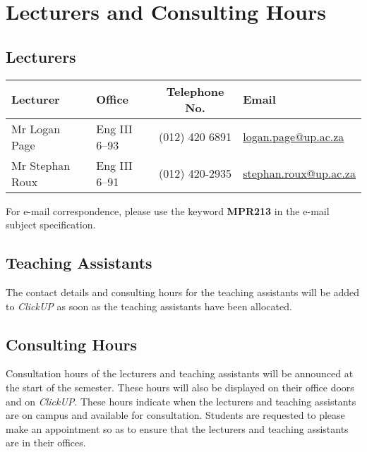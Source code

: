 \section{Lecturers and Consulting Hours}
    \subsection{Lecturers}
        \begin{table}[!h]
            \begin{center}
             \begin{tabular}{|l|l|c|l|}
                 \hline
                 {\bf Lecturer} & {\bf Office} & {\bf Telephone No.} & {\bf Email} \\
                 \hline
                 Mr Logan Page &
                 Eng III 6--93 &
                 (012) 420 6891 &
                 \href{mailto:logan.page@up.ac.za}{logan.page@up.ac.za} \\
                 Mr Stephan Roux &
                 Eng III 6--91 &
                 (012) 420-2935 &
                 \href{mailto:stephan.roux@up.ac.za}{stephan.roux@up.ac.za} \\
                 \hline
             \end{tabular}
            \end{center}
        \end{table}

        For e-mail correspondence, please use the keyword
        \textbf{MPR213} in the e-mail subject specification.

    \subsection{Teaching Assistants}
        The contact details and consulting hours for the teaching assistants
        will be added to {\it ClickUP} as soon as the teaching assistants have
        been allocated.

    \subsection{Consulting Hours}
        Consultation hours of the lecturers and teaching assistants will be
        announced at the start of the semester. These hours will also be
        displayed on their office doors and on {\it ClickUP}. These hours
        indicate when the lecturers and teaching assistants are on campus and
        available for consultation. Students are requested to please make an
        appointment so as to ensure that the lecturers and teaching assistants
        are in their offices.


